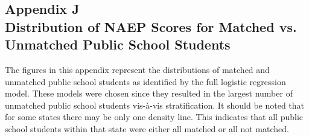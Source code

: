 \documentclass[letterpaper,12p,twoside]{article} %
\begin{document}
{%
\clearpage
{}
\subsection*{Appendix J\\Distribution of NAEP Scores for Matched vs. Unmatched Public School Students}
\label{appendixPublicDensity}

The figures in this appendix represent the distributions of matched and unmatched public school students as identified by the full logistic regression model. These models were chosen since they resulted in the largest number of unmatched public school students vis-\`a-vis stratification. It should be noted that for some states there may be only one density line. This indicates that all public school students within that state were either all matched or all not matched.

%
%
%

}
\end{document}
